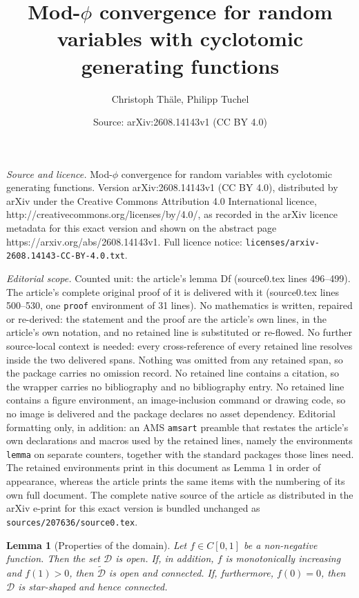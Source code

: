 \documentclass[10pt,a4paper]{amsart}
\title{Mod-$\phi$ convergence for random variables with cyclotomic generating functions}
\author{Christoph Th\"ale, Philipp Tuchel}
\date{Source: arXiv:2608.14143v1 (CC BY 4.0)}
\newtheorem{lemma}{Lemma}
\begin{document}
\maketitle

\noindent\emph{Source and licence.} Mod-$\phi$ convergence for random variables with cyclotomic generating functions. Version arXiv:2608.14143v1 (CC BY 4.0), distributed by arXiv under the Creative Commons Attribution 4.0 International licence, http://creativecommons.org/licenses/by/4.0/, as recorded in the arXiv licence metadata for this exact version and shown on the abstract page https://arxiv.org/abs/2608.14143v1. Full licence notice: \texttt{licenses/arxiv-2608.14143-CC-BY-4.0.txt}.\par\smallskip

\noindent\textit{Editorial scope.} Counted unit: the article's lemma Df (source0.tex lines 496--499). The article's complete original proof of it is delivered with it (source0.tex lines 500--530, one \texttt{proof} environment of 31 lines). No mathematics is written, repaired or re-derived: the statement and the proof are the article's own lines, in the article's own notation, and no retained line is substituted or re-flowed.  No further source-local context is needed: every cross-reference of every retained line resolves inside the two delivered spans.  Nothing was omitted from any retained span, so the package carries no omission record.  No retained line contains a citation, so the wrapper carries no bibliography and no bibliography entry.  No retained line contains a figure environment, an image-inclusion command or drawing code, so no image is delivered and the package declares no asset dependency.  Editorial formatting only, in addition: an AMS \texttt{amsart} preamble that restates the article's own declarations and macros used by the retained lines, namely the environments \texttt{lemma} on separate counters, together with the standard packages those lines need.  The retained environments print in this document as Lemma 1 in order of appearance, whereas the article prints the same items with the numbering of its own full document.  The complete native source of the article as distributed in the arXiv e-print for this exact version is bundled unchanged as \texttt{sources/207636/source0.tex}.
\begin{lemma}[Properties of the domain]\label{lem: properties of Df}
Let $f \in C[0, 1]$ be a non-negative function. Then the set $\mathscr{D}$ is open.
If, in addition, $f$ is monotonically increasing and $f(1)>0$, then $\widetilde{\mathscr{D}}$ is open and connected. If, furthermore, $f(0) = 0$, then $\mathscr{D}$ is star-shaped and hence connected.
\end{lemma}
\end{document}
